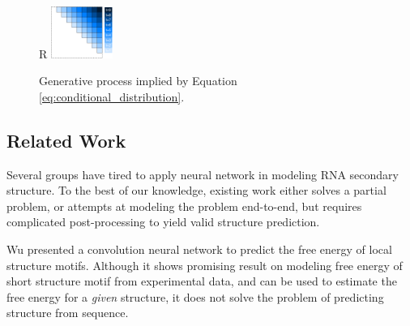 \documentclass{article}
\begin{document}




\begin{figure}{R}
    \centering
    \includegraphics[width=0.18\textwidth]{plot/autoregressive_direction.pdf}
    \caption{Generative process implied by Equation \ref{eq:conditional_distribution}.}
    \label{fig:autoregressive_direction}
    \centering
\end{figure}

\subsection{Related Work}

Several groups have tired to apply neural network in modeling RNA secondary structure.
To the best of our knowledge, existing work either solves a partial problem,
or attempts at modeling the problem end-to-end,
but requires complicated post-processing to yield valid structure prediction.

Wu\cite{wu2018convolutional} presented a convolution neural network to predict the free energy of local structure motifs.
Although it shows promising result on modeling free energy of short structure motif from experimental data,
and can be used to estimate the free energy for a \textit{given} structure,
it does not solve the problem of predicting structure from sequence.
\end{document}
